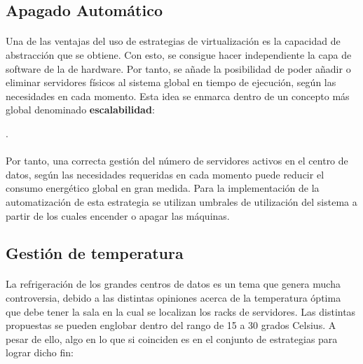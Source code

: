 \documentclass[10pt]{article}
\begin{document}
		\subsection{Apagado Automático}

			\paragraph{}
			Una de las ventajas del uso de estrategias de virtualización es la capacidad de abstracción que se obtiene. Con esto, se consigue hacer independiente la capa de software de la de hardware. Por tanto, se añade la posibilidad de poder añadir o eliminar servidores físicos al sistema global en tiempo de ejecución, según las necesidades en cada momento. Esta idea se enmarca dentro de un concepto más global denominado \textbf{escalabilidad}:

			\cite{wikipedia:escalabilidad}.

			\paragraph{}
			Por tanto, una correcta gestión del número de servidores activos en el centro de datos, según las necesidades requeridas en cada momento puede reducir el consumo energético global en gran medida. Para la implementación de la automatización de esta estrategia se utilizan umbrales de utilización del sistema a partir de los cuales encender o apagar las máquinas.


		\subsection{Gestión de temperatura}

			\paragraph{}
			La refrigeración de los grandes centros de datos es un tema que genera mucha controversia, debido a las distintas opiniones acerca de la temperatura óptima que debe tener la sala en la cual se localizan los racks de servidores. Las distintas propuestas se pueden englobar dentro del rango de 15 a 30 grados Celsius. A pesar de ello, algo en lo que si coinciden es en el conjunto de estrategias para lograr dicho fin:
\end{document}
